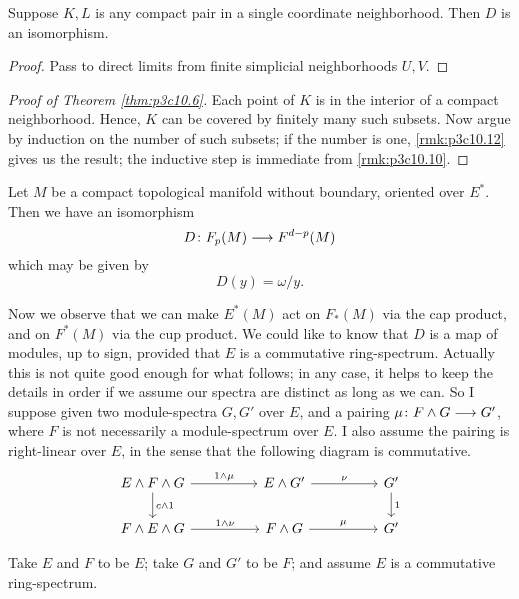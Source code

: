 \documentclass[../main]{subfiles}
\begin{document}
\begin{remark}\label{rmk:p3c10.12}
Suppose $K,L$ is any compact pair in a single coordinate neighborhood. Then $D$ is an isomorphism.
\end{remark}
\begin{proof}
Pass to direct limits from finite simplicial neighborhoods $U,V$.
\end{proof}
\begin{proof}[Proof of Theorem \ref{thm:p3c10.6}]
Each point of $K$ is in the interior of a compact neighborhood. Hence, $K$ can be covered by finitely many such subsets. Now argue by induction on the number of such subsets; if the number is one, \ref{rmk:p3c10.12} gives us the result; the inductive step is immediate from \ref{rmk:p3c10.10}.
\end{proof}
\begin{corollary}\label{cor:p3c10.13}
Let $M$ be a compact topological manifold without boundary, oriented over $E^*$. Then we have an isomorphism
\[D \colon F_p(M) \longrightarrow F^{d-p}(M)\]
which may be given by
\[D(y) = \omega / y.\]
\end{corollary}
Now we observe that we can make $E^*(M)$ act on $F_*(M)$ via the cap product, and on $F^*(M)$ via the cup product. We could like to know that $D$ is a map of modules, up to sign, provided that $E$ is a commutative ring-spectrum. Actually this is not quite good enough for what follows; in any case, it helps to keep the details in order if we assume our spectra are distinct as long as we can. So I suppose given two module-spectra $G,G'$ over $E$, and a pairing $\mu \colon F \wedge G \longrightarrow G'$, where $F$ is not necessarily a module-spectrum over $E$. I also assume the pairing is right-linear over $E$, in the sense that the following diagram is commutative.
\[
\begin{tikzcd}
E\wedge F \wedge G \arrow[rr, "1 \wedge \mu"] \arrow[d, "c \wedge 1"] &  & E\wedge G' \arrow[rr, "\nu"] &  & G' \arrow[d, "1"] \\
F \wedge E \wedge G \arrow[rr, "1 \wedge \nu"]                        &  & F\wedge G \arrow[rr, "\mu"]  &  & G'               
\end{tikzcd}
\]
\begin{examples}
Take $E$ and $F$ to be $E$; take $G$ and $G'$ to be $F$; and assume $E$ is a commutative ring-spectrum.
\end{examples}
\end{document}

